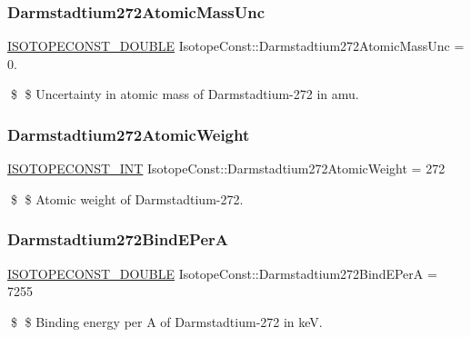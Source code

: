 \subsubsection{\texorpdfstring{Darmstadtium272\+Atomic\+Mass\+Unc}{Darmstadtium272AtomicMassUnc}}
{\footnotesize\ttfamily \mbox{\hyperlink{group___isotope_const-_macros_ga8f45a7272ce02c0b4c65c44636ed719a}{I\+S\+O\+T\+O\+P\+E\+C\+O\+N\+S\+T\+\_\+\+D\+O\+U\+B\+LE}} Isotope\+Const\+::\+Darmstadtium272\+Atomic\+Mass\+Unc = 0.}

\$ \$ Uncertainty in atomic mass of Darmstadtium-\/272 in amu. \mbox{\label{group___isotope_const-_darmstadtium-_ds272_ga5e2d5c21ce19f13fffb3f4e29407f6f7}} 
\subsubsection{\texorpdfstring{Darmstadtium272\+Atomic\+Weight}{Darmstadtium272AtomicWeight}}
{\footnotesize\ttfamily \mbox{\hyperlink{group___isotope_const-_macros_ga5f18360b3e99483a35c32d789e62621c}{I\+S\+O\+T\+O\+P\+E\+C\+O\+N\+S\+T\+\_\+\+I\+NT}} Isotope\+Const\+::\+Darmstadtium272\+Atomic\+Weight = 272}

\$ \$ Atomic weight of Darmstadtium-\/272. \mbox{\label{group___isotope_const-_darmstadtium-_ds272_gae16a813ccf6e0adac2a930d38128c87c}} 
\subsubsection{\texorpdfstring{Darmstadtium272\+Bind\+E\+PerA}{Darmstadtium272BindEPerA}}
{\footnotesize\ttfamily \mbox{\hyperlink{group___isotope_const-_macros_ga8f45a7272ce02c0b4c65c44636ed719a}{I\+S\+O\+T\+O\+P\+E\+C\+O\+N\+S\+T\+\_\+\+D\+O\+U\+B\+LE}} Isotope\+Const\+::\+Darmstadtium272\+Bind\+E\+PerA = 7255}

\$ \$ Binding energy per A of Darmstadtium-\/272 in keV. \mbox{\label{group___isotope_const-_darmstadtium-_ds272_ga7d4ff1fbf2c26b4add72c6b1ab799ae0}} 
